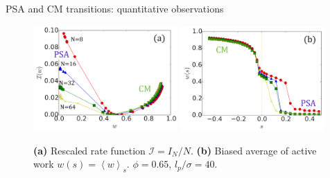 \documentclass{beamer}
\begin{document}
\begin{frame}{PSA and CM transitions: quantitative observations}

\begin{figure}
\centering
\includegraphics[width=0.49\textwidth]{Nemoto_2019_fig1a.png}
\hfill
\includegraphics[width=0.49\textwidth]{Nemoto_2019_fig1b.png}
\caption{{\bf (a)} Rescaled rate function $\mathcal{I} = I_N/N$. {\bf (b)} Biased average of active work $w(s) = \left<w\right>_s$. $\phi = 0.65$, $l_p/\sigma = 40$. }
\end{figure}


\end{frame}
\end{document}

